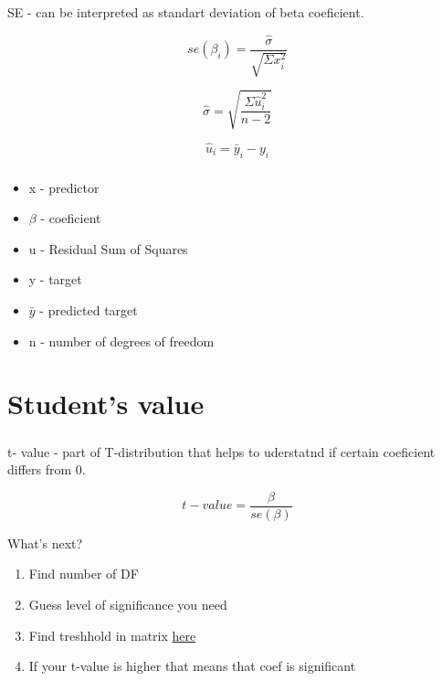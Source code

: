 \documentclass[t, 11pt]{beamer}
\begin{document}
\begin{frame} 
	\frametitle{\insertsection} 
 SE - can be interpreted as standart deviation of beta coeficient. 
 
 $$se(\beta_i) = \frac{\hat{\sigma}}{\sqrt{\Sigma x_i^2}}$$
 
  $$\hat{\sigma} = \sqrt{ \frac{\Sigma \hat{u}_i^2}{n-2} }$$
  
  $$\hat{u}_i = \bar{y}_i - y_i$$

 
 
\end{frame}	


\begin{frame} 
	\frametitle{\insertsection} 

	\begin{itemize}
		\item x - predictor
		\item $\beta$ - coeficient
		\item u - Residual Sum of Squares 
		\item y - target
		\item $\bar{y}$ - predicted target
		\item n - number of degrees of freedom
	\end{itemize}
	
	
\end{frame}	

\section{Student's value}

\begin{frame} 
	\frametitle{\insertsection} 
	t- value - part of T-distribution that helps to uderstatnd if certain coeficient differs from 0. 
	
	$$t-value = \frac{\beta} {se(\beta)}$$
	
	What's next?
	
	\begin{enumerate}
		\item Find number of DF
		\item Guess level of significance you need
		\item Find treshhold in matrix \href{http://www.sthda.com/english/wiki/t-distribution-table}{here}
		\item If your t-value is higher that means that coef is significant
	\end{enumerate}

\end{frame}	
\end{document}
